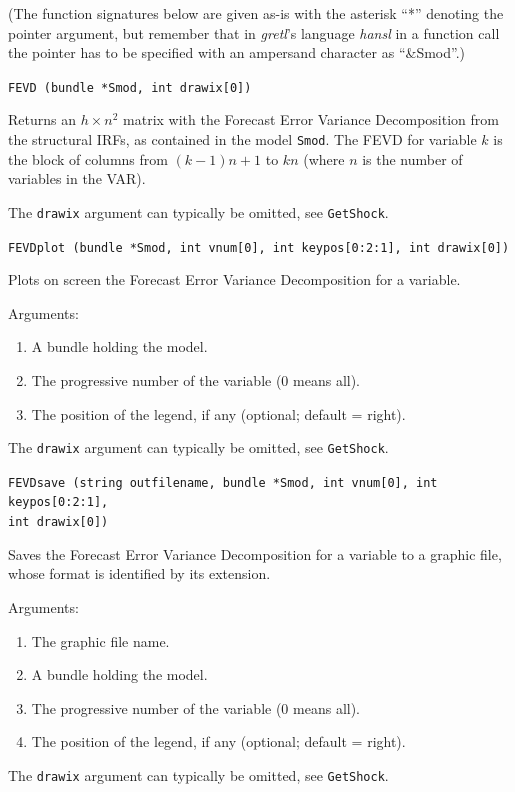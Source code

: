 \documentclass[a4paper,10pt]{article}
\newenvironment{funcdoc}[1]
{\noindent\hrulefill\newline\nopagebreak\texttt{#1}%
\nopagebreak\par\noindent\hrulefill%
\nopagebreak\par\nopagebreak\smallskip\nopagebreak\par}
{\bigskip}
\begin{document}
(The function signatures below are given as-is with the asterisk ``*'' denoting
the pointer argument, but remember that in \emph{gretl}'s language \emph{hansl} 
in a function call the pointer has to be 
specified with an ampersand character as ``\&Smod''.)


\begin{funcdoc}{FEVD (bundle *Smod, int drawix[0])}
  \noindent Returns an $h \times n^2$ matrix with  
  the Forecast Error Variance Decomposition from the
  structural IRFs, as contained in the model \texttt{Smod}. 
  The FEVD for variable $k$ is the block of
  columns from $(k-1) n + 1$ to $k n$ (where $n$ is the number of
  variables in the VAR).
  
  The \texttt{drawix} argument can typically be omitted, see \texttt{GetShock}.
\end{funcdoc}

\begin{funcdoc}{FEVDplot (bundle *Smod, int vnum[0], int keypos[0:2:1], int drawix[0])}
  \noindent Plots on screen the Forecast Error Variance Decomposition for a
  variable. 
  
   \noindent Arguments:
  \begin{enumerate}
  \item A bundle holding the model.
  \item The progressive number of the variable (0 means all).
  \item The position of the legend, if any (optional; default = right).
  \end{enumerate}
  
  The \texttt{drawix} argument can typically be omitted, see \texttt{GetShock}.
\end{funcdoc}

\begin{funcdoc}{FEVDsave (string outfilename, bundle *Smod, int vnum[0], int keypos[0:2:1], \\
int drawix[0])}
  \noindent Saves the Forecast Error Variance Decomposition for a variable to a
  graphic file, whose format is identified by its extension. 
  
   \noindent Arguments:
   
  \begin{enumerate}
  \item The graphic file name.
  \item A bundle holding the model.
  \item The progressive number of the variable (0 means all).
  \item The position of the legend, if any (optional; default = right).
  \end{enumerate}
  
  The \texttt{drawix} argument can typically be omitted, see \texttt{GetShock}.
\end{funcdoc}
\end{document}
